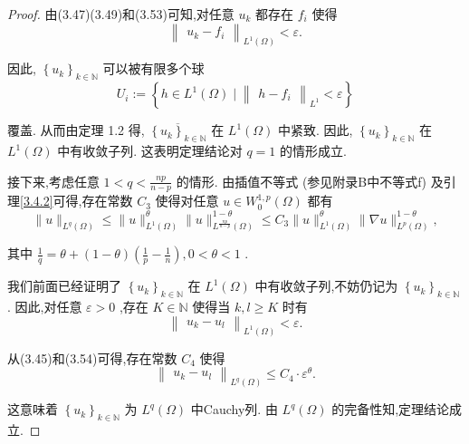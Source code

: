 \documentclass[lang=cn,newtx,10pt,scheme=chinese,thmcnt=chapter]{elegantbook}
\begin{document}
\begin{proof}
由(3.47)(3.49)和(3.53)可知,对任意 \({u}_{k}\) 都存在 \({f}_{i}\) 使得
\begin{equation*}
{\begin{Vmatrix}{u}_{k} - {f}_{i}\end{Vmatrix}}_{{L}^{1}\left( \Omega \right) } < \varepsilon .
\end{equation*}

因此, \({\left\{  {u}_{k}\right\}  }_{k \in  \mathbb{N}}\) 可以被有限多个球
\begin{equation*}
{U}_{i} \mathrel{\text{ := }} \left\{  {h \in  {L}^{1}\left( \Omega \right)  \mid  {\begin{Vmatrix}h - {f}_{i}\end{Vmatrix}}_{{L}^{1}} < \varepsilon }\right\}
\end{equation*}

覆盖. 从而由定理 1.2 得, \(\overline{{\left\{  {u}_{k}\right\}  }_{k \in  \mathbb{N}}}\) 在 \({L}^{1}\left( \Omega \right)\) 中紧致. 因此, \({\left\{  {u}_{k}\right\}  }_{k \in  \mathbb{N}}\) 在 \({L}^{1}\left( \Omega \right)\) 中有收敛子列. 这表明定理结论对 \(q = 1\) 的情形成立.

接下来,考虑任意 \(1 < q < \frac{np}{n - p}\) 的情形. 由插值不等式 (参见附录B中不等式f) 及引理\ref{3.4.2}可得,存在常数 \({C}_{3}\) 使得对任意 \(u \in  {W}_{0}^{1,p}\left( \Omega \right)\) 都有
\begin{equation}
\parallel u{\parallel }_{{L}^{q}\left( \Omega \right) } \leqslant  \parallel u{\parallel }_{{L}^{1}\left( \Omega \right) }^{\theta }\parallel u{\parallel }_{{L}^{\frac{np}{n - p}}\left( \Omega \right) }^{1 - \theta } \leqslant  {C}_{3}\parallel u{\parallel }_{{L}^{1}\left( \Omega \right) }^{\theta }\parallel \nabla u{\parallel }_{{L}^{p}\left( \Omega \right) }^{1 - \theta }, \label{3.54}
\end{equation}

其中 \(\frac{1}{q} = \theta  + \left( {1 - \theta }\right) \left( {\frac{1}{p} - \frac{1}{n}}\right) ,0 < \theta  < 1\) .

我们前面已经证明了 \({\left\{  {u}_{k}\right\}  }_{k \in  \mathbb{N}}\) 在 \({L}^{1}\left( \Omega \right)\) 中有收敛子列,不妨仍记为 \({\left\{  {u}_{k}\right\}  }_{k \in  \mathbb{N}}\) . 因此,对任意 \(\varepsilon  > 0\) ,存在 \(K \in  \mathbb{N}\) 使得当 \(k,l \geq  K\) 时有
\begin{equation*}
{\begin{Vmatrix}{u}_{k} - {u}_{l}\end{Vmatrix}}_{{L}^{1}\left( \Omega \right) } < \varepsilon .
\end{equation*}

从(3.45)和(3.54)可得,存在常数 \({C}_{4}\) 使得
\begin{equation*}
{\begin{Vmatrix}{u}_{k} - {u}_{l}\end{Vmatrix}}_{{L}^{q}\left( \Omega \right) } \leqslant  {C}_{4} \cdot  {\varepsilon }^{\theta }.
\end{equation*}

这意味着 \({\left\{  {u}_{k}\right\}  }_{k \in  \mathbb{N}}\) 为 \({L}^{q}\left( \Omega \right)\) 中Cauchy列. 由 \({L}^{q}\left( \Omega \right)\) 的完备性知,定理结论成立.
\end{proof}
\end{document}
